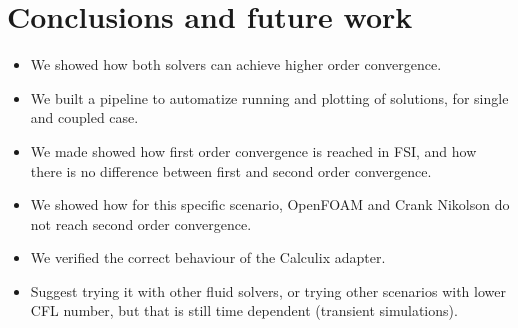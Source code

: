 \documentclass[
  english,        %
  font=times,     %
  onecolumn,      %
]{tumarticle}
\begin{document}
\section{Conclusions and future work}
\begin{itemize}
    \item We showed how both solvers can achieve higher order convergence.
    \item We built a pipeline to automatize running and plotting of solutions, for single and coupled case.
    \item We made showed how first order convergence is reached in FSI, and how there is no difference between first and second order convergence.
    \item We showed how for this specific scenario, OpenFOAM and Crank Nikolson do not reach second order convergence.
    \item We verified the correct behaviour of the Calculix adapter.
    \item Suggest trying it with other fluid solvers, or trying other scenarios with lower CFL number, but that is still time dependent (transient simulations).
\end{itemize}

\printbibliography
\end{document}
